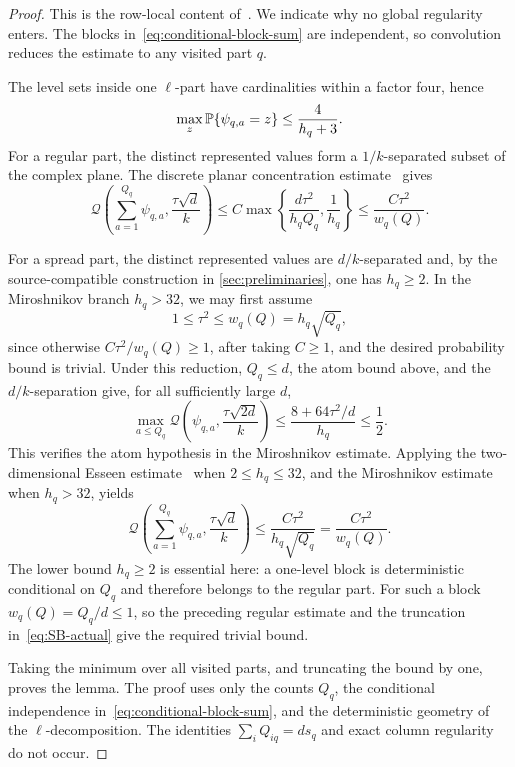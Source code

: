 \begin{proof}
This is the row-local content of~\cite[Lemma~6.4]{LLTTY19}. We indicate why no global regularity enters. The blocks in~\eqref{eq:conditional-block-sum} are independent, so convolution reduces the estimate to any visited part $q$.

The level sets inside one $\ell$-part have cardinalities within a factor four, hence
\[
  \max_z\mathbb P\{\psi_{q,a}=z\}\le\frac4{h_q+3}.
\]
For a regular part, the distinct represented values form a $1/k$-separated subset of the complex plane. The discrete planar concentration estimate~\cite[Proposition~2.5]{LLTTY19} gives
\[
  \mathcal Q\!\left(\sum_{a=1}^{Q_q}\psi_{q,a},\frac{\tau\sqrt d}{k}\right)
  \le C\max\left\{\frac{d\tau^2}{h_qQ_q},\frac1{h_q}\right\}
  \le\frac{C\tau^2}{w_q(Q)}.
\]

For a spread part, the distinct represented values are $d/k$-separated and, by the source-compatible construction in \cref{sec:preliminaries}, one has $h_q\ge2$. In the Miroshnikov branch $h_q>32$, we may first assume
\[
  1\le\tau^2\le w_q(Q)=h_q\sqrt{Q_q},
\]
since otherwise $C\tau^2/w_q(Q)\ge1$, after taking $C\ge1$, and the desired probability bound is trivial. Under this reduction, $Q_q\le d$, the atom bound above, and the $d/k$-separation give, for all sufficiently large $d$,
\[
  \max_{a\le Q_q}\mathcal Q\!\left(\psi_{q,a},\frac{\tau\sqrt{2d}}{k}\right)
  \le\frac{8+64\tau^2/d}{h_q}\le\frac12.
\]
This verifies the atom hypothesis in the Miroshnikov estimate. Applying the two-dimensional Esseen estimate~\cite[Proposition~2.2]{LLTTY19} when $2\le h_q\le32$, and the Miroshnikov estimate~\cite[Proposition~2.3]{LLTTY19} when $h_q>32$, yields
\[
  \mathcal Q\!\left(\sum_{a=1}^{Q_q}\psi_{q,a},\frac{\tau\sqrt d}{k}\right)
  \le\frac{C\tau^2}{h_q\sqrt{Q_q}}
  =\frac{C\tau^2}{w_q(Q)}.
\]
The lower bound $h_q\ge2$ is essential here: a one-level block is deterministic conditional on $Q_q$ and therefore belongs to the regular part. For such a block $w_q(Q)=Q_q/d\le1$, so the preceding regular estimate and the truncation in~\eqref{eq:SB-actual} give the required trivial bound.

Taking the minimum over all visited parts, and truncating the bound by one, proves the lemma. The proof uses only the counts $Q_q$, the conditional independence in~\eqref{eq:conditional-block-sum}, and the deterministic geometry of the $\ell$-decomposition. The identities $\sum_iQ_{iq}=ds_q$ and exact column regularity do not occur.
\end{proof}

